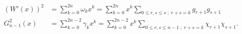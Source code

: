 \begin{equation}
 \begin{split}
  (W'(x))^2 &= \sum \limits_{k=0}^{2n} \omega_k x^k = \sum \limits_{k=0}^{2n} x^{k} \sum \limits_{0 \leq r,s \leq s \; ; \; r+s = k} g_{r+1} g_{s+1} \\
  G_{n-1}^2(x) &= \sum \limits_{k=0}^{2n-2} \gamma_k x^k = \sum \limits_{k=0}^{2n-2}x^{k}  \sum \limits_{0 \leq r,s \leq n-1 \; ; \; r+s = k} \chi_{r+1} \chi_{s+1}.
 \end{split}
\end{equation}

